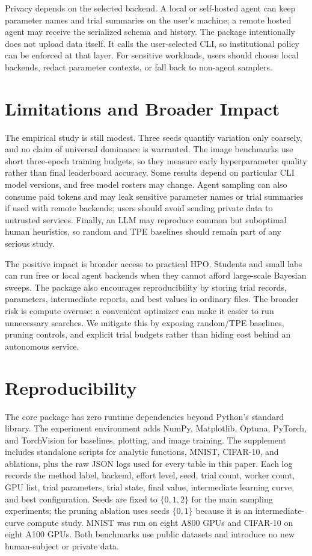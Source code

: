 \documentclass[letterpaper]{article}
\begin{document}
Privacy depends on the selected backend. A local or self-hosted agent can keep
parameter names and trial summaries on the user's machine; a remote hosted
agent may receive the serialized schema and history. The package intentionally
does not upload data itself. It calls the user-selected CLI, so institutional
policy can be enforced at that layer. For sensitive workloads, users should
choose local backends, redact parameter contexts, or fall back to non-agent
samplers.

\section{Limitations and Broader Impact}

The empirical study is still modest. Three seeds quantify variation only
coarsely, and no claim of universal dominance is warranted. The image
benchmarks use short three-epoch training budgets, so they measure early
hyperparameter quality rather than final leaderboard accuracy. Some results
depend on particular CLI model versions, and free model rosters may change.
Agent sampling can also consume paid tokens and may leak sensitive parameter
names or trial summaries if used with remote backends; users should avoid
sending private data to untrusted services. Finally, an LLM may reproduce
common but suboptimal human heuristics, so random and TPE baselines should
remain part of any serious study.

The positive impact is broader access to practical HPO. Students and small labs
can run free or local agent backends when they cannot afford large-scale
Bayesian sweeps. The package also encourages reproducibility by storing trial
records, parameters, intermediate reports, and best values in ordinary files.
The broader risk is compute overuse: a convenient optimizer can make it easier
to run unnecessary searches. We mitigate this by exposing random/TPE baselines,
pruning controls, and explicit trial budgets rather than hiding cost behind an
autonomous service.

\section{Reproducibility}

The core package has zero runtime dependencies beyond Python's standard
library. The experiment environment adds NumPy, Matplotlib, Optuna, PyTorch, and
TorchVision for baselines, plotting, and image training. The supplement includes
standalone scripts for analytic functions, MNIST, CIFAR-10, and ablations, plus
the raw JSON logs used for every table in this paper. Each log records the
method label, backend, effort level, seed, trial count, worker count, GPU list,
trial parameters, trial state, final value, intermediate learning curve, and
best configuration. Seeds are fixed to $\{0,1,2\}$ for the main sampling
experiments; the pruning ablation uses seeds $\{0,1\}$ because it is an
intermediate-curve compute study. MNIST was run on eight A800 GPUs and CIFAR-10
on eight A100 GPUs. Both benchmarks use public datasets and introduce no new
human-subject or private data.
\end{document}
